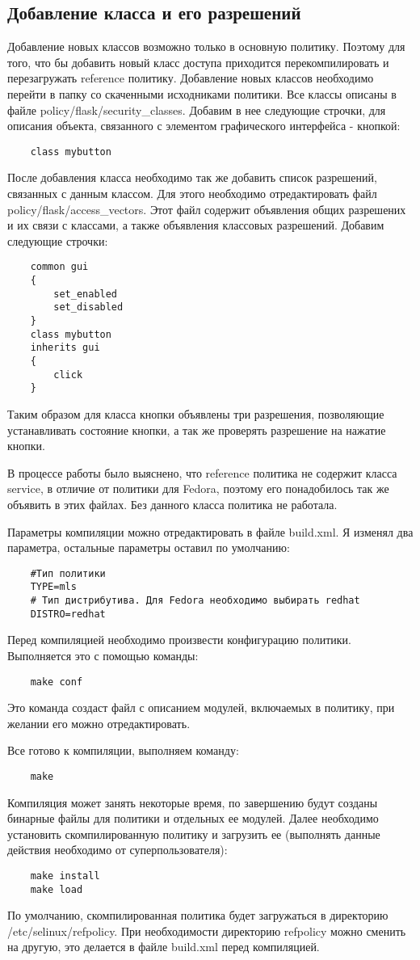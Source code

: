 \documentclass{./../class/UIR}
\begin{document}
	\subsection{Добавление класса и его разрешений}
	Добавление новых классов возможно только в основную политику. Поэтому для того,
	что бы добавить новый класс доступа приходится перекомпилировать и
	перезагружать reference политику. 
	Добавление новых классов необходимо перейти в папку со скаченными исходниками
	политики. Все классы описаны в файле policy/flask/security\_classes. Добавим в
	нее следующие строчки, для описания объекта, связанного с элементом графического
	интерфейса - кнопкой:
	\begin{verbatim}
	class mybutton
	\end{verbatim}
	После добавления класса необходимо так же добавить список разрешений, связанных
	с данным классом. Для этого необходимо отредактировать файл
	policy/flask/access\_vectors. Этот файл содержит объявления общих разрешених и
	их связи с классами, а также объявления классовых разрешений. Добавим следующие
	строчки:
	\begin{verbatim}
	common gui 
	{
	    set_enabled
	    set_disabled
	}
	class mybutton
	inherits gui
	{
        click
	}
	\end{verbatim}	
	Таким образом для класса кнопки объявлены три разрешения, позволяющие
	устанавливать состояние кнопки, а так же проверять разрешение на нажатие
	кнопки.
	
	В процессе работы было выяснено, что reference политика не содержит класса
	service, в отличие от политики для Fedora, поэтому его понадобилось так же
	объявить в этих файлах. Без данного класса политика не работала.
	
	Параметры компиляции можно отредактировать в файле build.xml.
	Я изменял два параметра, остальные параметры оставил по умолчанию:
	\begin{verbatim}
	#Тип политики
	TYPE=mls
	# Тип дистрибутива. Для Fedora необходимо выбирать redhat
	DISTRO=redhat
	\end{verbatim}
	Перед компиляцией необходимо произвести конфигурацию политики. Выполняется это
	с помощью команды:
	\begin{verbatim}
	make conf
	\end{verbatim}
	Это команда создаст файл с описанием модулей, включаемых в политику, при
	желании его можно отредактировать.
	
	Все готово к компиляции, выполняем команду:
	\begin{verbatim}
	make
	\end{verbatim}
	Компиляция может занять некоторые время, по завершению будут созданы бинарные
	файлы для политики и отдельных ее модулей. Далее необходимо установить
	скомпилированную политику и загрузить ее (выполнять данные действия необходимо
	от суперпользователя):
	\begin{verbatim}
	make install
	make load
	\end{verbatim}
	По умолчанию, скомпилированная политика будет загружаться в директорию
	/etc/selinux/refpolicy. При необходимости директорию refpolicy можно сменить на
	другую, это делается в файле build.xml перед компиляцией. 
	
\end{document}
